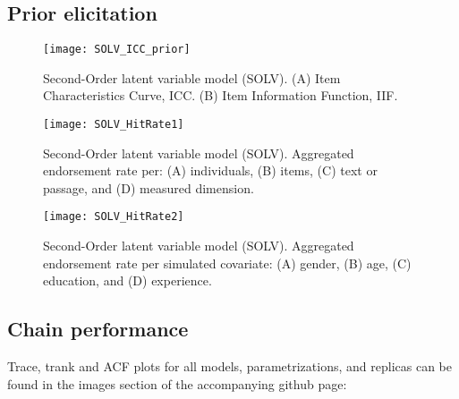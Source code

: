 \subsection{Prior elicitation}
%
\begin{figure}[H]
	\centering
	\texttt{[image: SOLV\_ICC\_prior]}
	\caption[Second-Order latent variable model (SOLV). Item Characteristic Curve (ICC) and Item Information Function (IIF).]%
	{Second-Order latent variable model (SOLV). (A) Item Characteristics Curve, ICC. (B) Item Information Function, IIF.}
	\label{fig:SOLV_ICC_prior}
\end{figure}
%
\begin{figure}[H]
	\centering
	\texttt{[image: SOLV\_HitRate1]}
	\caption[Second-Order latent variable model (SOLV). Hit rate per dimensions of interest.]%
	{Second-Order latent variable model (SOLV). Aggregated endorsement rate per: (A) individuals, (B) items, (C) text or passage, and (D) measured dimension.}
	\label{fig:SOLV_hitrate1}
\end{figure}
%
\begin{figure}[H]
	\centering
	\texttt{[image: SOLV\_HitRate2]}
	\caption[Second-Order latent variable model (SOLV). Hit rate per simulated covariate.]%
	{Second-Order latent variable model (SOLV). Aggregated endorsement rate per simulated covariate: (A) gender, (B) age, (C) education, and (D) experience.}
	\label{fig:SOLV_hitrate2}
\end{figure}


\subsection{Chain performance}

Trace, trank and ACF plots for all models, parametrizations, and replicas can be found in the images section of the accompanying github page:

